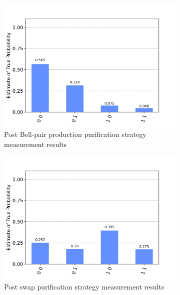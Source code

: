 \documentclass[11pt]{article}
\begin{document}
\begin{figure}[ht]
  \centering
  \begin{subfigure}[b]{0.45\textwidth}
    \includegraphics[width=\linewidth]{figures/dps_measurement_post_bell_pair.jpg}
    \caption{Post Bell-pair production purification strategy\\measurement results}
    \label{fig:image1}
  \end{subfigure}
  \begin{subfigure}[b]{0.45\textwidth}
    \includegraphics[width=\linewidth]{figures/dps_measurement_post_swap.jpg}
    \caption{Post swap purification strategy measurement results}
    \label{fig:image2}
  \end{subfigure}
  \\
  \begin{subfigure}[b]{0.45\textwidth}

\end{subfigure}
\end{figure}
\end{document}
